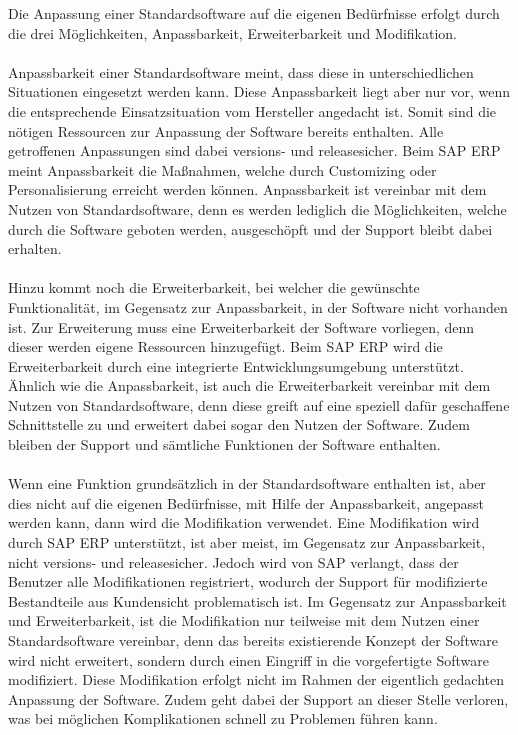 \label{sec:Aufgabe 1}

Die Anpassung einer Standardsoftware auf die eigenen Bedürfnisse erfolgt durch die drei Möglichkeiten, Anpassbarkeit, Erweiterbarkeit und Modifikation.\\
\\
Anpassbarkeit einer Standardsoftware meint, dass diese in unterschiedlichen
Situationen eingesetzt werden kann. Diese Anpassbarkeit liegt aber nur vor, wenn
die entsprechende Einsatzsituation vom Hersteller angedacht ist. Somit sind die
nötigen Ressourcen zur Anpassung der Software bereits enthalten. Alle getroffenen Anpassungen sind dabei versions- und releasesicher. Beim SAP ERP meint Anpassbarkeit die Maßnahmen, welche durch Customizing oder Personalisierung erreicht werden können. Anpassbarkeit ist vereinbar mit dem Nutzen von Standardsoftware, denn es werden lediglich die Möglichkeiten, welche durch die Software geboten werden, ausgeschöpft und der Support bleibt dabei erhalten. \\
\\
Hinzu kommt noch die Erweiterbarkeit, bei welcher die gewünschte Funktionalität,
im Gegensatz zur Anpassbarkeit, in der Software nicht vorhanden ist. Zur
Erweiterung muss eine Erweiterbarkeit der Software vorliegen, denn dieser werden
eigene Ressourcen hinzugefügt. Beim SAP ERP wird die Erweiterbarkeit durch eine integrierte Entwicklungsumgebung unterstützt. Ähnlich wie die Anpassbarkeit, ist auch die Erweiterbarkeit vereinbar mit dem Nutzen von Standardsoftware, denn diese greift auf eine speziell dafür geschaffene Schnittstelle zu und erweitert dabei sogar den Nutzen der Software. Zudem bleiben der Support und sämtliche Funktionen der Software enthalten. \\
\\
Wenn eine Funktion grundsätzlich in der Standardsoftware enthalten ist, aber
dies nicht auf die eigenen Bedürfnisse, mit Hilfe der Anpassbarkeit, angepasst
werden kann, dann wird die Modifikation verwendet. Eine Modifikation wird durch SAP ERP unterstützt, ist aber meist, im Gegensatz zur Anpassbarkeit, nicht versions- und releasesicher. Jedoch wird von SAP verlangt, dass der Benutzer alle Modifikationen registriert, wodurch der Support für modifizierte Bestandteile aus Kundensicht problematisch ist. Im Gegensatz zur Anpassbarkeit und Erweiterbarkeit, ist die Modifikation nur teilweise mit dem Nutzen einer Standardsoftware vereinbar, denn das bereits existierende Konzept der Software wird nicht erweitert, sondern durch einen Eingriff in die vorgefertigte Software modifiziert. Diese Modifikation erfolgt nicht im Rahmen der eigentlich gedachten Anpassung der Software. Zudem geht dabei der Support an dieser Stelle verloren, was bei möglichen Komplikationen schnell zu Problemen führen kann.
